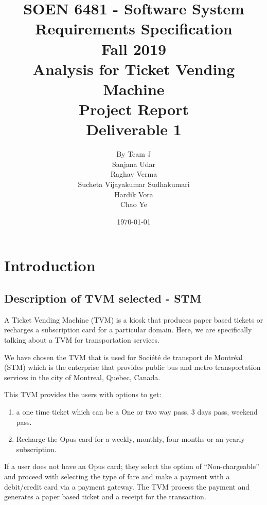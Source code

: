 \documentclass[12pt]{report}
\begin{document}
\title{\textbf{SOEN 6481 - Software System Requirements Specification}\\[1ex]\normalsize{Fall 2019}\\[6ex]\LARGE{\textbf{Analysis for Ticket Vending Machine\\Project Report}}\\[3ex]\LARGE{Deliverable 1}}
\author{By Team J\\Sanjana Udar\\Raghav Verma\\Sucheta Vijayakumar Sudhakumari\\Hardik Vora\\Chao Ye}
\date{\today}
\maketitle

\tableofcontents
\clearpage

\chapter{Introduction}
\section{Description of TVM selected - STM}
A Ticket Vending Machine (TVM) is a kiosk that produces paper based tickets or recharges a subscription card for a particular domain. Here, we are specifically talking about a TVM for transportation services.

We have chosen the TVM that is used for Société de transport de Montréal (STM) which is the enterprise that provides public bus and metro transportation services in the city of Montreal, Quebec, Canada. 

This TVM provides the users with options to get:
\begin{enumerate}
\item a one time ticket which can be a One or two way pass, 3 days pass, weekend pass.
\item Recharge the Opus card for a weekly, monthly, four-months or an yearly subscription. 
\end{enumerate}

If a user does not have an Opus card; they select the option of “Non-chargeable” and proceed with selecting the type of fare and make a payment with a debit/credit card via a payment gateway. The TVM process the payment and generates a paper based ticket and a receipt for the transaction.
\end{document}

